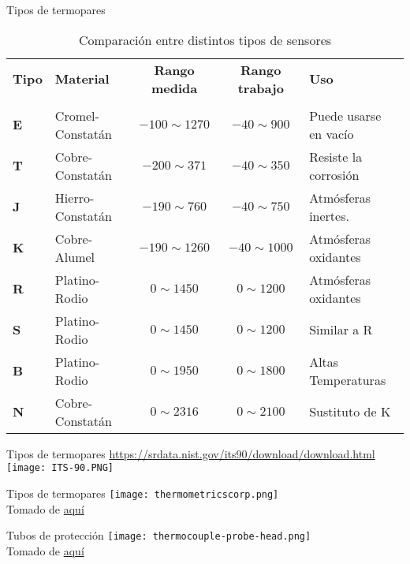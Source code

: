 \documentclass[aspectratio=169]{beamer}
\begin{document}
\begin{frame}{Tipos de termopares}
  \begin{table}[]
    \centering
    \footnotesize{
    \begin{tabular}{m{0.6cm} m{3.4cm} c c m{3.8cm}}
        \toprule
        \textbf{Tipo} & \textbf{Material} &\textbf{Rango medida} & \textbf{Rango trabajo} & \textbf{Uso} \\
        &  &  \centering[\si{\celsius}] & \centering[\si{\celsius}] & \\
        \midrule
        \textbf{E} & Cromel-Constatán & $-100\sim 1270$ & $-40\sim 900$ & Puede usarse en vacío\\
        \textbf{T} & Cobre-Constatán & $-200\sim  371$ & $-40\sim 350$ & Resiste la corrosión\\
        \textbf{J} & Hierro-Constatán & $-190\sim  760$ & $-40\sim 750$ & Atmósferas inertes.\\
        \textbf{K} & Cobre-Alumel & $-190\sim  1260$ & $-40\sim 1000$ & Atmósferas oxidantes\\
        \textbf{R} & Platino-Rodio & $0\sim  1450$ & $0\sim 1200$ & Atmósferas oxidantes\\
        \textbf{S} & Platino-Rodio & $0\sim  1450$ & $0\sim 1200$ & Similar a R\\
        \textbf{B} & Platino-Rodio & $0\sim  1950$ & $0\sim 1800$ & Altas Temperaturas\\
        \textbf{N} & Cobre-Constatán & $0\sim  2316$ & $0\sim 2100$ & Sustituto de K\\
        \bottomrule
    \end{tabular}
    }
    \caption{Comparación entre distintos tipos de sensores\cite{sole2005instrumentacion}}
    \label{tab:Comparacion_termo}
\end{table}
\end{frame}
\begin{frame}{Tipos de termopares \tiny{\href{https://srdata.nist.gov/its90/download/download.html}{https://srdata.nist.gov/its90/download/download.html}}}
\centering
    \texttt{[image: ITS-90.PNG]}
\end{frame}
\begin{frame}{Tipos de termopares}
\centering
    \texttt{[image: thermometricscorp.png]}
    \\ \tiny{Tomado de \href{https://www.thermometricscorp.com/thermocouple-color-code.html}{aquí}}
\end{frame}
\begin{frame}{Tubos de protección}
\centering
    \texttt{[image: thermocouple-probe-head.png]}
    \\ \tiny{Tomado de \href{https://www.tcaus.com.au/thermocouple/index.html}{aquí}}
\end{frame}
\end{document}
